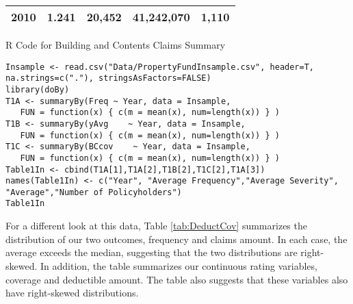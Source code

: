 \documentclass[]{book}
\theoremstyle{definition}
\theoremstyle{definition}
\theoremstyle{definition}
\theoremstyle{remark}
\begin{document}
\begin{longtable}[]{@{}lrrrr@{}}
\begin{minipage}[t]{0.17\columnwidth}
2010\strut
\end{minipage} & \begin{minipage}[t]{0.14\columnwidth}\raggedleft\strut
1.241\strut
\end{minipage} & \begin{minipage}[t]{0.17\columnwidth}\raggedleft\strut
20,452\strut
\end{minipage} & \begin{minipage}[t]{0.16\columnwidth}\raggedleft\strut
41,242,070\strut
\end{minipage} & \begin{minipage}[t]{0.16\columnwidth}\raggedleft\strut
1,110\strut
\end{minipage}\tabularnewline
\bottomrule
\end{longtable}

R Code for Building and Contents Claims Summary

\hypertarget{display.CoverageBC.2}{}
\begin{verbatim}
Insample <- read.csv("Data/PropertyFundInsample.csv", header=T, na.strings=c("."), stringsAsFactors=FALSE)
library(doBy)
T1A <- summaryBy(Freq ~ Year, data = Insample, 
   FUN = function(x) { c(m = mean(x), num=length(x)) } )
T1B <- summaryBy(yAvg    ~ Year, data = Insample,   
   FUN = function(x) { c(m = mean(x), num=length(x)) } )
T1C <- summaryBy(BCcov    ~ Year, data = Insample,   
   FUN = function(x) { c(m = mean(x), num=length(x)) } )
Table1In <- cbind(T1A[1],T1A[2],T1B[2],T1C[2],T1A[3])
names(Table1In) <- c("Year", "Average Frequency","Average Severity", "Average","Number of Policyholders")
Table1In
\end{verbatim}

For a different look at this data, Table \ref{tab:DeductCov} summarizes
the distribution of our two outcomes, frequency and claims amount. In
each case, the average exceeds the median, suggesting that the two
distributions are right-skewed. In addition, the table summarizes our
continuous rating variables, coverage and deductible amount. The table
also suggests that these variables also have right-skewed distributions.
\end{document}
